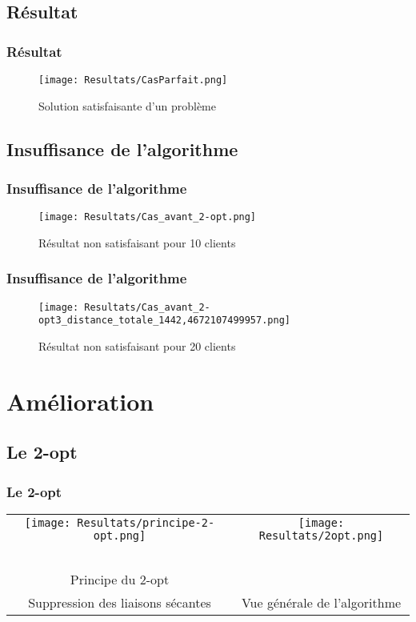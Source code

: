 \documentclass[10pt]{beamer}
\begin{document}
	\subsection{Résultat}

	\begin{frame}
		\frametitle{Résultat}
		\begin{figure}
			\texttt{[image: Resultats/CasParfait.png]}
			\caption{Solution satisfaisante d'un problème}	
		\end{figure}
	\end{frame}

	\subsection{Insuffisance de l'algorithme}
	   
	\begin{frame}
		\frametitle{Insuffisance de l'algorithme}
		\begin{figure}
			\texttt{[image: Resultats/Cas\_avant\_2-opt.png]}
			\caption{Résultat non satisfaisant pour 10 clients}	
		\end{figure}
	\end{frame}

	\begin{frame}
		\frametitle{Insuffisance de l'algorithme}
		\begin{figure}
			\texttt{[image: Resultats/Cas\_avant\_2-opt3\_distance\_totale\_1442,4672107499957.png]}
			\caption{Résultat non satisfaisant pour 20 clients}	
		\end{figure}
	\end{frame}

	\section{Amélioration}

	\subsection{Le 2-opt}

	\begin{frame}
		\frametitle{Le 2-opt}
		\begin{tabular}{cc}
				\texttt{[image: Resultats/principe-2-opt.png]}
				&
				\texttt{[image: Resultats/2opt.png]}
				\\
				\ \\Principe du 2-opt\\Suppression des liaisons sécantes
				&
				Vue générale de l'algorithme
		\end{tabular}
	\end{frame}
\end{document}
